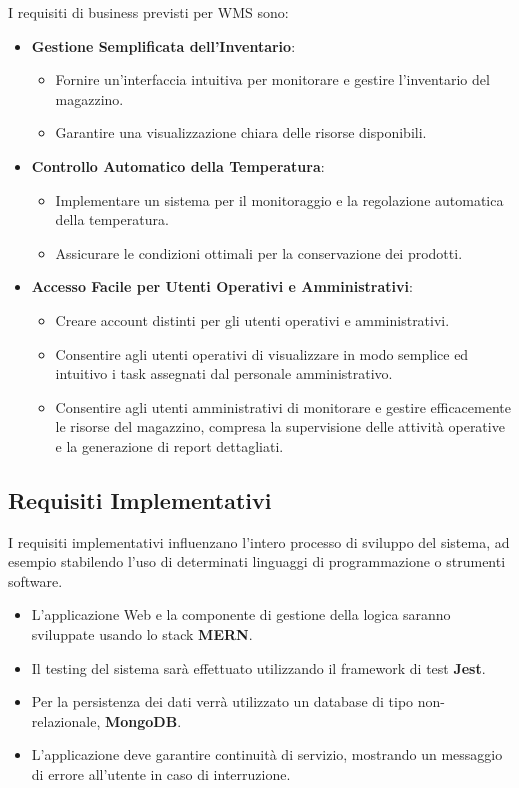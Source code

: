 I requisiti di business previsti per WMS sono:
\begin{itemize}
    \item \textbf{Gestione Semplificata dell'Inventario}:
    \begin{itemize}
        \item Fornire un'interfaccia intuitiva per monitorare e gestire l'inventario del magazzino.
        \item Garantire una visualizzazione chiara delle risorse disponibili.
    \end{itemize}
    \item \textbf{Controllo Automatico della Temperatura}:
    \begin{itemize}
        \item Implementare un sistema per il monitoraggio e la regolazione automatica della temperatura.
        \item Assicurare le condizioni ottimali per la conservazione dei prodotti.
    \end{itemize}
    \item \textbf{Accesso Facile per Utenti Operativi e Amministrativi}:
    \begin{itemize}
        \item Creare account distinti per gli utenti operativi e amministrativi.
        \item Consentire agli utenti operativi di visualizzare in modo semplice ed intuitivo i task assegnati dal personale amministrativo.
        \item Consentire agli utenti amministrativi di monitorare e gestire efficacemente le risorse del magazzino, compresa la supervisione delle attività operative e la generazione di report dettagliati.
    \end{itemize}
\end{itemize}

\subsection{Requisiti Implementativi}

I requisiti implementativi influenzano l'intero processo di sviluppo del
sistema, ad esempio stabilendo l'uso di determinati linguaggi di programmazione o strumenti software.

\begin{itemize}
    \item L'applicazione Web e la componente di gestione della logica saranno sviluppate usando lo stack \textbf{MERN}.
    \item Il testing del sistema sarà effettuato utilizzando il framework di test \textbf{Jest}.
    \item Per la persistenza dei dati verrà utilizzato un database di tipo non-relazionale, \textbf{MongoDB}.
    \item L'applicazione deve garantire continuità di servizio, mostrando un messaggio di errore all'utente in caso di interruzione.
\end{itemize}